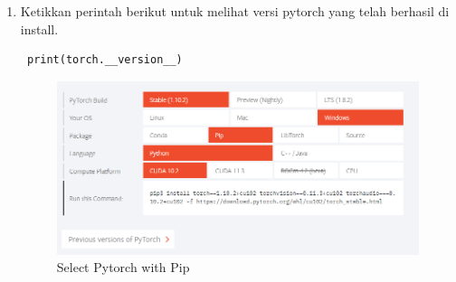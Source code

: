 \begin{enumerate}
\item Ketikkan perintah berikut untuk melihat versi pytorch yang telah berhasil di install.
\begin{verbatim}
 print(torch.__version__)
\end{verbatim}
\begin{figure}[H]
\centering
\includegraphics[scale=.35]{figures/pytorch2}
\caption{Select Pytorch with Pip}
\label{pytorch2}
\end{figure}

\end{enumerate}

